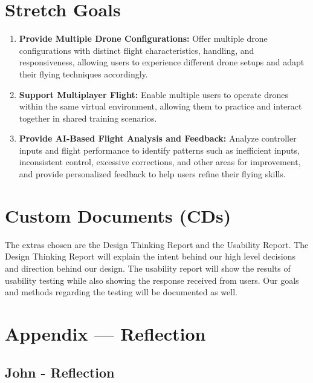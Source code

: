\documentclass{article}
\begin{document}
\section{Stretch Goals}

\begin{enumerate}
    \item \textbf{Provide Multiple Drone Configurations:} Offer multiple drone configurations with distinct flight characteristics, handling, and responsiveness, allowing users to experience different drone setups and adapt their flying techniques accordingly.

    \item \textbf{Support Multiplayer Flight:} Enable multiple users to operate drones within the same virtual environment, allowing them to practice and interact together in shared training scenarios.

    \item \textbf{Provide AI-Based Flight Analysis and Feedback:} Analyze controller inputs and flight performance to identify patterns such as inefficient inputs, inconsistent control, excessive corrections, and other areas for improvement, and provide personalized feedback to help users refine their flying skills.

\end{enumerate}

\section{Custom Documents (CDs)}

The extras chosen are the Design Thinking Report and the Usability Report. The Design Thinking Report will explain the intent behind our high level decisions and direction behind our design. The usability report will show the results of usability testing while also showing the response received from users. Our goals and methods regarding the testing will be documented as well.

\newpage{}

\section*{Appendix --- Reflection}

% 

\subsection*{John - Reflection}
\end{document}
